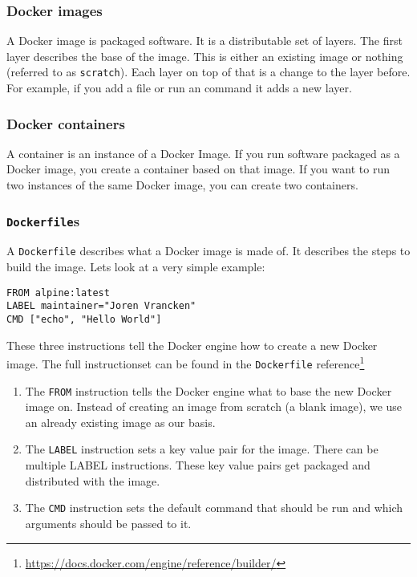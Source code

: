 \subsubsection{Docker images}
A Docker image is packaged software. It is a distributable set of layers. The first layer describes the base of the image. This is either an existing image or nothing (referred to as \lstinline{scratch}). Each layer on top of that is a change to the layer before. For example, if you add a file or run an command it adds a new layer.

\subsubsection{Docker containers}
A container is an instance of a Docker Image. If you run software packaged as a Docker image, you create a container based on that image. If you want to run two instances of the same Docker image, you can create two containers.

\subsubsection{\lstinline{Dockerfile}s}
A \lstinline{Dockerfile} describes what a Docker image is made of. It describes the steps to build the image. Lets look at a very simple example:

\begin{lstlisting}[caption={Very Basic \lstinline{Dockerfile}},label={dockerfile:simple},captionpos=b]
FROM alpine:latest
LABEL maintainer="Joren Vrancken"
CMD ["echo", "Hello World"]
\end{lstlisting}

These three instructions tell the Docker engine how to create a new Docker image.
The full instructionset can be found in the \lstinline{Dockerfile} reference\footnote{\url{https://docs.docker.com/engine/reference/builder/}}

\begin{enumerate}
    \item The \lstinline{FROM} instruction tells the Docker engine what to base the new Docker image on. Instead of creating an image from scratch (a blank image), we use an already existing image as our basis.

    \item The \lstinline{LABEL} instruction sets a key value pair for the image. There can be multiple LABEL instructions. These key value pairs get packaged and distributed with the image.

    \item The \lstinline{CMD} instruction sets the default command that should be run and which arguments should be passed to it.
\end{enumerate}

